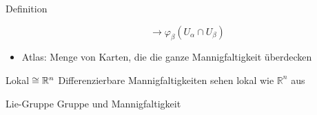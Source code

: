 \begin{frame}[t]
\begin{columns}[t,onlytextwidth]
\begin{column}{0.48\textwidth}
\begin{block}{Definition}
\begin{itemize}
\[\to
\varphi_\beta(U_\alpha\cap U_\beta)
\]
\item Atlas: Menge von Karten, die die ganze Mannigfaltigkeit überdecken
\end{itemize}
\end{block}
\vspace{-7pt}
\begin{block}{Lokal$\mathstrut\cong\mathbb{R}^n$}
Differenzierbare Mannigfaltigkeiten sehen lokal wie $\mathbb{R}^n$ aus
\end{block}
\vspace{-3pt}
\begin{block}{Lie-Gruppe}
Gruppe und Mannigfaltigkeit
\end{block}
\end{column}
\end{columns}
\end{frame}
\egroup
